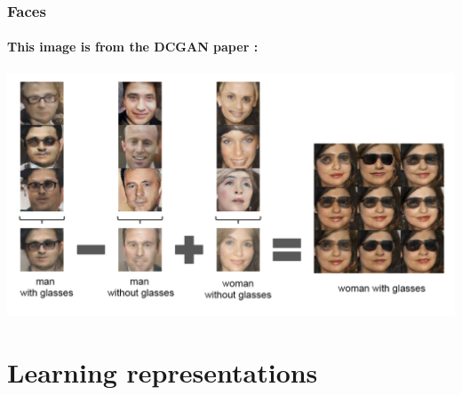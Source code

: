 \documentclass{beamer}
\begin{document}
\begin{frame}[allowframebreaks]
\frametitle{Faces}
\framesubtitle{This image is from the DCGAN paper \cite{repLearnDcgan}:}
\includegraphics[scale=0.25]{woman-with-glasses}
\end{frame}


\section{Learning representations}
\end{document}
